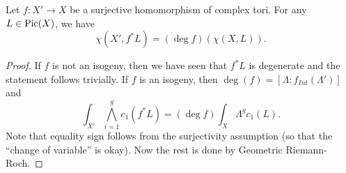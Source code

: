\begin{corollary}
Let $f:X'\to X$ be a surjective homomorphism of complex tori. For any $L\in \operatorname{Pic}(X)$, we have 
$$\chi(X', f^* L)=(\deg f)(\chi(X,L)).$$
\end{corollary}

\begin{proof}
If $f$ is not an isogeny, then we have seen that $f^* L$ is degenerate and the statement follows trivially. If $f$ is an isogeny, then $\deg (f)=[\Lambda:f_{Int}(\Lambda')]$ and 
$$\int_{X'} \bigwedge_{i=1}^g c_1(f^* L)=(\deg f)\int_X \Lambda^g c_1(L).$$
Note that equality sign follows from the surjectivity assumption (so that the ``change of variable'' is okay). Now the rest is done by Geometric Riemann-Roch.
\end{proof}